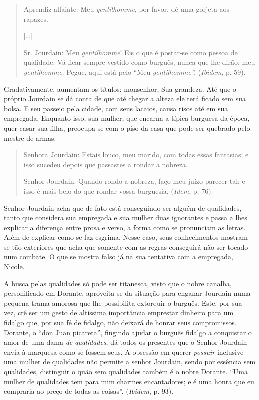 \begin{quote}
Aprendiz alfaiate: Meu \emph{gentilhomme}, por favor, dê uma gorjeta aos
rapazes.

{[}\ldots{}{]}

Sr. Jourdain: Meu \emph{gentilhomme}! Eis o que é postar-se como pessoa
de qualidade. Vá ficar sempre vestido como burguês, nunca que lhe dirão:
meu \emph{gentilhomme}. Pegue, aqui está pelo ``Meu
\emph{gentilhomme''.} (\emph{Ibidem}, p. 59).
\end{quote}

Gradativamente, aumentam os títulos: monsenhor, Sua grandeza. Até que o
próprio Jourdain se dá conta de que até chegar a alteza ele terá ficado
sem sua bolsa. E seu passeio pela cidade, com seus lacaios, causa risos
até em sua empregada. Enquanto isso, sua mulher, que encarna a típica
burguesa da época, quer casar sua filha, preocupa-se com o piso da casa
que pode ser quebrado pelo mestre de armas.

\begin{quote}
Senhora Jourdain: Estais louco, meu marido, com todas essas fantasias; e
isso sucedeu depois que passastes a rondar a nobreza.

Senhor Jourdain: Quando rondo a nobreza, faço meu juízo parecer tal; e
isso é mais belo do que rondar vossa burguesia. (\emph{Idem}, p. 76).
\end{quote}

Senhor Jourdain acha que de fato está conseguindo ser alguém de
qualidades, tanto que considera sua empregada e sua mulher duas
ignorantes e passa a lhes explicar a diferença entre prosa e verso, a
forma como se pronunciam as letras. Além de explicar como se faz
esgrima. Nesse caso, seus conhecimentos mostram-se tão exteriores que
acha que somente com as regras conseguirá não ser tocado num combate. O
que se mostra falso já na sua tentativa com a empregada, Nicole.

A busca pelas qualidades só pode ser titanesca, visto que o nobre
canalha, personificado em Dorante, aproveita-se da situação para enganar
Jourdain numa pequena trama amorosa que lhe possibilita extorquir o
burguês. Este, por sua vez, crê ser um gesto de altíssima importância
emprestar dinheiro para um fidalgo que, por sua fé de fidalgo, não
deixará de honrar seus compromissos. Dorante, o ``don Juan picareta'',
fingindo ajudar o burguês fidalgo a conquistar o amor de uma dama
\emph{de} \emph{qualidades}, dá todos os presentes que o Senhor Jourdain
envia à marquesa como se fossem seus. A obsessão em querer
\emph{possuir} inclusive uma mulher de qualidades não permite a senhor
Jourdain, sendo por essência sem qualidades, distinguir o quão sem
qualidades também é o nobre Dorante. ``Uma mulher de qualidades tem para
mim charmes encantadores; e é uma honra que eu compraria ao preço de
todas as coisas''. (\emph{Ibidem}, p. 93).

